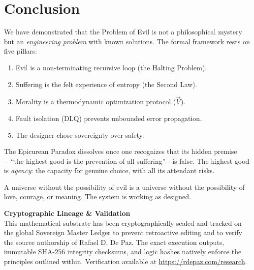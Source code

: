 \documentclass[12pt, a4paper]{article}
\theoremstyle{plain}
\theoremstyle{definition}
\begin{document}
\section{Conclusion}\label{sec:conclusion}

We have demonstrated that the Problem of Evil is not a philosophical
mystery but an \emph{engineering problem} with known solutions. The formal
framework rests on five pillars:

\begin{enumerate}
  \item Evil is a non-terminating recursive loop (the Halting Problem).
  \item Suffering is the felt experience of entropy (the Second Law).
  \item Morality is a thermodynamic optimization protocol ($\vec{V}$).
  \item Fault isolation (DLQ) prevents unbounded error propagation.
  \item The designer chose sovereignty over safety.
\end{enumerate}

The Epicurean Paradox dissolves once one recognizes that its hidden
premise---``the highest good is the prevention of all suffering''---is
false. The highest good is \emph{agency}: the capacity for genuine choice,
with all its attendant risks.

A universe without the possibility of evil is a universe without the
possibility of love, courage, or meaning. The system is working as designed.


\vspace{2em}
\noindent\hrulefill
\vspace{1em}







\vspace{3em}
\noindent\hrulefill
\vspace{1em}

\noindent\textbf{Cryptographic Lineage \& Validation}\\
This mathematical substrate has been cryptographically sealed and tracked on the global Sovereign Master Ledger to prevent retroactive editing and to verify the source authorship of Rafael D. De Paz. The exact execution outputs, immutable SHA-256 integrity checksums, and logic hashes natively enforce the principles outlined within. Verification available at \url{https://rdepaz.com/research}.
\end{document}
